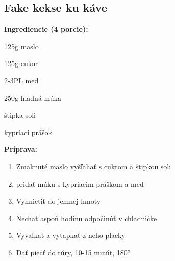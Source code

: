 \setcounter{step}{0}

\subsection{ Fake kekse ku káve }

\begin{ingredient}
  
  \def\portions{  }
  \textbf{ {\normalsize Ingrediencie (4 porcie):} }

  \begin{main}
      \item 125g maslo
      \item 125g cukor
      \item 2-3PL med
      \item 250g hladná múka
      \item štipka soli
      \item kypriaci prášok
  \end{main}
  
\end{ingredient}
\begin{recipe}
\textbf{ {\normalsize Príprava:} }
\begin{enumerate}

  \item{Zmäknuté maslo vyšľahať s cukrom a štipkou soli}
  \item{pridať múku s kypriacim práškom a med}
  \item{Vyhnietiť do jemnej hmoty}
  \item{Nechať aspoň hodinu odpočinúť v chladničke}
  \item{Vyvaľkať a vyťapkať z neho placky}
  \item{Dať piecť do rúry, 10-15 minút, 180°}

\end{enumerate}
\end{recipe}

\begin{notes}
  
\end{notes}	
\clearpage
